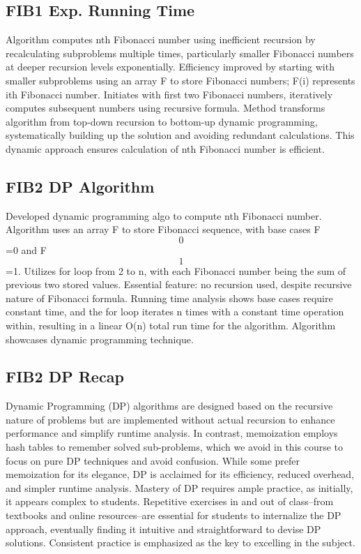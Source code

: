 \subsection*{FIB1  Exp.
Running Time}
Algorithm computes nth Fibonacci number using inefficient recursion by recalculating subproblems multiple times, particularly smaller Fibonacci numbers at deeper recursion levels exponentially.
Efficiency improved by starting with smaller subproblems using an array F to store Fibonacci numbers; F(i) represents ith Fibonacci number.
Initiates with first two Fibonacci numbers, iteratively computes subsequent numbers using recursive formula.
Method transforms algorithm from top-down recursion to bottom-up dynamic programming, systematically building up the solution and avoiding redundant calculations.
This dynamic approach ensures calculation of nth Fibonacci number is efficient.

\subsection*{FIB2  DP Algorithm}
Developed dynamic programming algo to compute nth Fibonacci number.
Algorithm uses an array F to store Fibonacci sequence, with base cases F\[0\]=0 and F\[1\]=1.
Utilizes for loop from 2 to n, with each Fibonacci number being the sum of previous two stored values.
Essential feature: no recursion used, despite recursive nature of Fibonacci formula.
Running time analysis shows base cases require constant time, and the for loop iterates n times with a constant time operation within, resulting in a linear O(n) total run time for the algorithm.
Algorithm showcases dynamic programming technique.

\subsection*{FIB2  DP Recap}
Dynamic Programming (DP) algorithms are designed based on the recursive nature of problems but are implemented without actual recursion to enhance performance and simplify runtime analysis.
In contrast, memoization employs hash tables to remember solved sub-problems, which we avoid in this course to focus on pure DP techniques and avoid confusion.
While some prefer memoization for its elegance, DP is acclaimed for its efficiency, reduced overhead, and simpler runtime analysis.
Mastery of DP requires ample practice, as initially, it appears complex to students.
Repetitive exercises in and out of class--from textbooks and online resources--are essential for students to internalize the DP approach, eventually finding it intuitive and straightforward to devise DP solutions.
Consistent practice is emphasized as the key to excelling in the subject.

